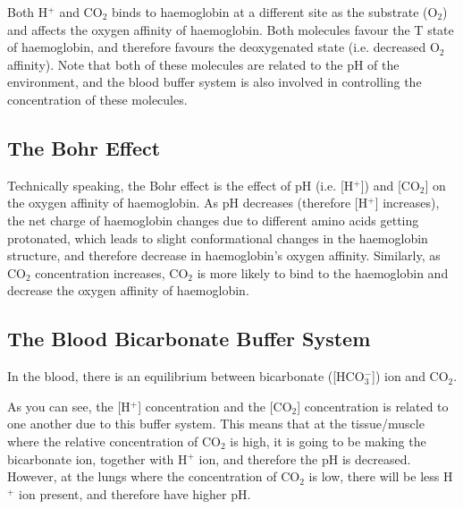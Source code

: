 Both H$^+$ and CO$_2$ binds to haemoglobin at a different site as the substrate (O$_2$) and affects the oxygen affinity of haemoglobin.
Both molecules favour the T state of haemoglobin, and therefore favours the deoxygenated state (i.e. decreased O$_2$ affinity).
Note that both of these molecules are related to the pH of the environment, and the blood buffer system is also involved in controlling the concentration of these molecules.

\subsection{The Bohr Effect}

Technically speaking, the Bohr effect is the effect of pH (i.e. [H$^+$]) and [CO$_2$] on the oxygen affinity of haemoglobin.
As pH decreases (therefore [H$^+$] increases), the net charge of haemoglobin changes due to different amino acids getting protonated, which leads to slight conformational changes in the haemoglobin structure, and therefore decrease in haemoglobin's oxygen affinity.
Similarly, as CO$_2$ concentration increases, CO$_2$ is more likely to bind to the haemoglobin and decrease the oxygen affinity of haemoglobin.

\begin{center}
\end{center}

\subsection{The Blood Bicarbonate Buffer System}

In the blood, there is an equilibrium between bicarbonate ([HCO$_3^-$]) ion and CO$_2$.

\begin{center}
\end{center}

As you can see, the [H$^+$] concentration and the [CO$_2$] concentration is related to one another due to this buffer system.
This means that at the tissue/muscle where the relative concentration of CO$_2$ is high, it is going to be making the bicarbonate ion, together with H$^+$ ion, and therefore the pH is decreased.
However, at the lungs where the concentration of CO$_2$ is low, there will be less H$^+$ ion present, and therefore have higher pH.

